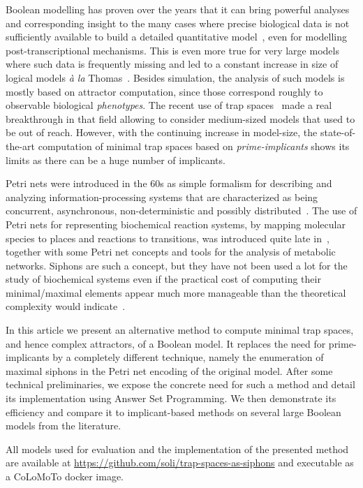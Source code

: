 \documentclass[runningheads]{llncs}
\begin{document}
Boolean modelling has proven over the years that it can bring powerful analyses and corresponding insight to the many cases where precise biological data is not sufficiently available to build a detailed quantitative model~\cite{wang2012boolean}, even for modelling post-transcriptional mechanisms.
This is even more true for very large models where such data is frequently missing and led to a constant increase in size of logical models \emph{à la} Thomas~\cite{aghamiri2020automated}.
Besides simulation, the analysis of such models is mostly based on attractor computation, since those correspond roughly to observable biological \emph{phenotypes}. The recent use of trap spaces~\cite{klarner2015computing} made a real breakthrough in that field allowing to consider medium-sized models that used to be out of reach.
However, with the continuing increase in model-size, the state-of-the-art computation of minimal trap spaces based on \emph{prime-implicants} shows its limits as there can be a huge number of implicants.

Petri nets were introduced in the 60s as simple formalism for describing and analyzing information-processing systems that are characterized as being concurrent, asynchronous, non-deterministic and possibly distributed~\cite{peterson1981petri,Murata1989}.
The use of Petri nets for representing biochemical reaction systems, by mapping molecular species to places and reactions to transitions, was introduced quite late in~\cite{reddy1993petri}, together with some Petri net concepts and tools for the analysis of metabolic networks.
Siphons are such a concept, but they have not been used a lot for the study of biochemical systems even if the practical cost of computing their minimal/maximal elements appear much more manageable than the theoretical complexity would indicate~\cite{nabli2016enumerating}.

In this article we present an alternative method to compute minimal trap spaces, and hence complex attractors, of a Boolean model. It replaces the need for prime-implicants by a completely different technique, namely the enumeration of maximal siphons in the Petri net encoding of the original model.
After some technical preliminaries, we expose the concrete need for such a method and detail its implementation using Answer Set Programming.
We then demonstrate its efficiency and compare it to implicant-based methods on several large Boolean models from the literature.


All models used for evaluation and the implementation of the presented method are available at \url{https://github.com/soli/trap-spaces-as-siphons} and executable as a CoLoMoTo docker image.
\end{document}
